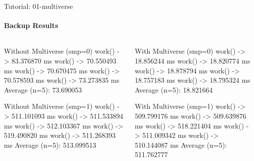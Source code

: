 \RequirePackage{luatex85}\documentclass[beamer,xcolor={table,rgb,dvipsnames}]{beamer}
\begin{document}
\begin{frame}[fragile,t]{Tutorial: 01-multiverse}
  \framesubtitle{Backup Results}
  \begin{columns}
    \begin{column}{0.49\textwidth}
      \begin{code}[]
        \begin{codetext}
Without Multiverse (smp=0)
 work() -> 83.376870 ms
 work() -> 70.550493 ms
 work() -> 70.670475 ms
 work() -> 70.578593 ms
 work() -> 73.273835 ms
Average (n=5): 73.690053

Without Multiverse (smp=1)
 work() -> 511.101093 ms
 work() -> 511.533894 ms
 work() -> 512.103367 ms
 work() -> 519.490820 ms
 work() -> 511.268393 ms
Average (n=5): 513.099513
        \end{codetext}
      \end{code}
    \end{column}\hfill
    \begin{column}{0.49\textwidth}
\begin{code}[]
  \begin{codetext}
With Multiverse (smp=0)
 work() -> 18.856244 ms
 work() -> 18.820774 ms
 work() -> 18.878794 ms
 work() -> 18.757183 ms
 work() -> 18.795324 ms
Average (n=5): 18.821664


With Multiverse (smp=1)
 work() -> 509.799176 ms
 work() -> 509.639876 ms
 work() -> 518.221404 ms
 work() -> 511.009342 ms
 work() -> 510.144087 ms
Average (n=5): 511.762777
  \end{codetext}
\end{code}
    \end{column}
  \end{columns}

  
\end{frame}

\end{document}
